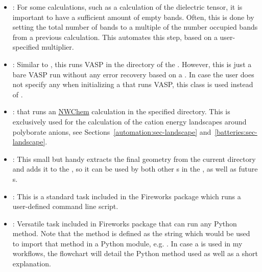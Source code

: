 \begin{refsection}
\begin{itemize} 
 
 \label{automation:sec-IncreaseNumberOfBands} 
\item {}: For some calculations, such as a 
calculation of the dielectric tensor, it is important to have a sufficient 
amount of empty bands. Often, this is done by setting the total number of bands to a multiple of the number
occupied bands from a previous calculation. This  automates 
this step, based on a user-specified multiplier. 
 
 \label{automation:sec-VaspTask} 
\item {}: Similar to 
, this 
 runs VASP in the directory of the . 
However, this is just a bare VASP run without any error recovery 
based on a . In case the user does not specify any 
 when initializing a  that runs 
VASP, this class is used instead of . 
 
 \label{automation:sec-NWChemTask} 
\item {}:  that runs an 
\href{http://www.nwchem-sw.org/index.php/Main_Page}{NWChem} calculation in 
the specified directory. This is exclusively used for the calculation of the 
cation energy landscapes around polyborate anions, see Sections~\ref{automation:sec-landscape} and~\ref{batteries:sec-landscape}.
 
 \label{automation:sec-AddFinalGeometryToSpec} 
\item {}: This small but handy  
extracts the final geometry from the current directory and adds it to the 
, so it can be used by both other s in the 
, as well as future s. 
 
 \label{automation:sec-ScriptTask} 
\item {}: This is a standard task included in the Fireworks package 
which runs a user-defined command line script. 
 
 \label{automation:sec-PyTask} 
\item {}: Versatile task included in Fireworks package that can run 
any Python method. Note that the method is defined as the string which would 
be used to import that method in a Python module, e.g. 
. In case a 
 is used in my workflows, the flowchart will detail the Python 
method used as well as a short explanation. 


\end{itemize}
\end{refsection}
